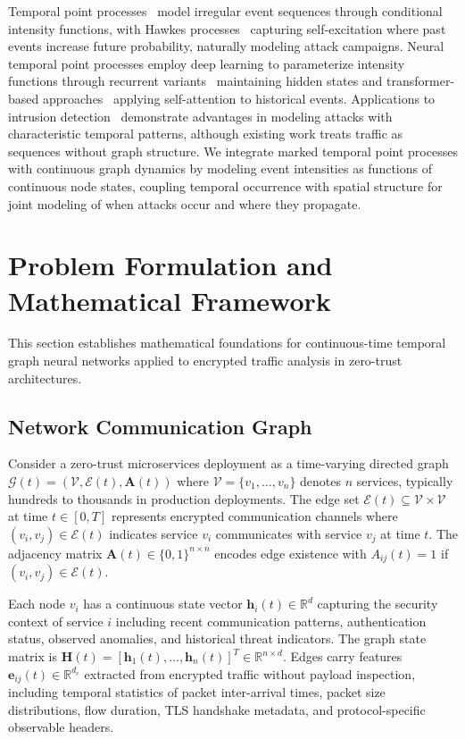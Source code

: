 \documentclass[lettersize,journal]{IEEEtran}
\newcommand{\R}{\mathbb{R}}
\newcommand{\G}{\mathcal{G}}
\newcommand{\V}{\mathcal{V}}
\begin{document}
Temporal point processes~\cite{daley2003introduction} model irregular event sequences through conditional intensity functions, with Hawkes processes~\cite{hawkes1971spectra} capturing self-excitation where past events increase future probability, naturally modeling attack campaigns. Neural temporal point processes employ deep learning to parameterize intensity functions through recurrent variants~\cite{du2016recurrent} maintaining hidden states and transformer-based approaches~\cite{zuo2020transformer,zhang2020selfatt} applying self-attention to historical events. Applications to intrusion detection~\cite{gao2024hplstm} demonstrate advantages in modeling attacks with characteristic temporal patterns, although existing work treats traffic as sequences without graph structure. We integrate marked temporal point processes with continuous graph dynamics by modeling event intensities as functions of continuous node states, coupling temporal occurrence with spatial structure for joint modeling of when attacks occur and where they propagate.
\section{Problem Formulation and Mathematical Framework}
\label{sec:framework}

This section establishes mathematical foundations for continuous-time temporal graph neural networks applied to encrypted traffic analysis in zero-trust architectures.

\subsection{Network Communication Graph}

Consider a zero-trust microservices deployment as a time-varying directed graph $\G(t) = (\V, \mathcal{E}(t), \mathbf{A}(t))$ where $\V = \{v_1, \ldots, v_n\}$ denotes $n$ services, typically hundreds to thousands in production deployments. The edge set $\mathcal{E}(t) \subseteq \V \times \V$ at time $t \in [0,T]$ represents encrypted communication channels where $(v_i, v_j) \in \mathcal{E}(t)$ indicates service $v_i$ communicates with service $v_j$ at time $t$. The adjacency matrix $\mathbf{A}(t) \in \{0,1\}^{n \times n}$ encodes edge existence with $A_{ij}(t) = 1$ if $(v_i, v_j) \in \mathcal{E}(t)$.

Each node $v_i$ has a continuous state vector $\mathbf{h}_i(t) \in \R^d$ capturing the security context of service $i$ including recent communication patterns, authentication status, observed anomalies, and historical threat indicators. The graph state matrix is $\mathbf{H}(t) = [\mathbf{h}_1(t), \ldots, \mathbf{h}_n(t)]^T \in \R^{n \times d}$. Edges carry features $\mathbf{e}_{ij}(t) \in \R^{d_e}$ extracted from encrypted traffic without payload inspection, including temporal statistics of packet inter-arrival times, packet size distributions, flow duration, TLS handshake metadata, and protocol-specific observable headers.
\end{document}
